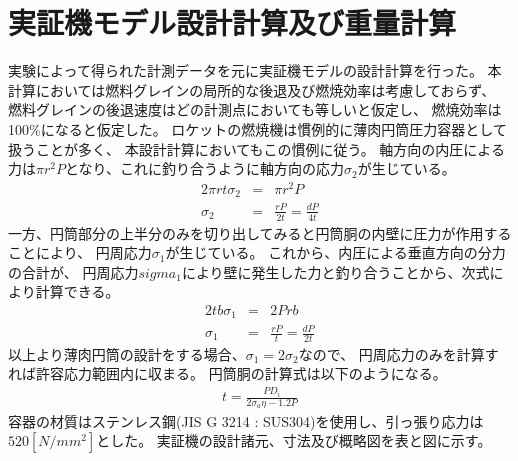 \section{実証機モデル設計計算及び重量計算}
実験によって得られた計測データを元に実証機モデルの設計計算を行った。
本計算においては燃料グレインの局所的な後退及び燃焼効率は考慮しておらず、
燃料グレインの後退速度はどの計測点においても等しいと仮定し、
燃焼効率は100\%になると仮定した。
ロケットの燃焼機は慣例的に薄肉円筒圧力容器として扱うことが多く、
本設計計算においてもこの慣例に従う。
軸方向の内圧による力は$\pi r^2 P$となり、これに釣り合うように軸方向の応力$\sigma_2$が生じている。
\begin{eqnarray}
2\pi r t \sigma_2 &=& \pi r^2 P \\
\sigma_2 &=& \frac{rP}{2t}=\frac{dP}{4t}
\end{eqnarray}
一方、円筒部分の上半分のみを切り出してみると円筒胴の内壁に圧力が作用することにより、
円周応力$\sigma_1$が生じている。
これから、内圧による垂直方向の分力の合計が、
円周応力$sigma_1$により壁に発生した力と釣り合うことから、次式により計算できる。
\begin{eqnarray}
2tb\sigma_1 &=& 2Prb \\
\sigma_1 &=& \frac{rP}{t}= \frac{dP}{2t}
\end{eqnarray}
以上より薄肉円筒の設計をする場合、$\sigma_1=2\sigma_2$なので、
円周応力のみを計算すれば許容応力範囲内に収まる。
円筒胴の計算式は以下のようになる。
\begin{eqnarray}
t = \frac{PD_i}{2\sigma_a \eta - 1.2P}
\end{eqnarray}
容器の材質はステンレス鋼(JIS G 3214 : SUS304)を使用し、引っ張り応力は$520[N/mm^2]$とした。
実証機の設計諸元、寸法及び概略図を表と図に示す。



